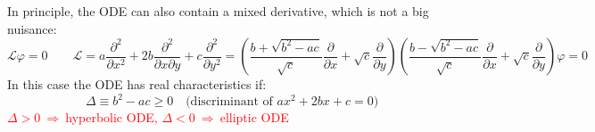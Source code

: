 \documentclass{article}
\begin{document}
\noindent
In principle, the ODE can also contain a mixed derivative, which is not a big nuisance:
\begin{equation}
    \mathcal{L} \varphi = 0
\qquad
\mathcal{L} = a \frac{\partial^2}{\partial x^2}
+ 2b \frac{\partial^2}{\partial x \partial y}
+ c \frac{\partial^2}{\partial y^2}
=
\left( \frac{b + \sqrt{b^2 - a c}}{\sqrt{c}} \frac{\partial}{\partial x}
+ \sqrt{c} \frac{\partial}{\partial y} \right)
\left( \frac{b - \sqrt{b^2 - a c}}{\sqrt{c}} \frac{\partial}{\partial x}
+ \sqrt{c} \frac{\partial}{\partial y} \right) \varphi = 0
\end{equation}
In this case the ODE has real characteristics if:
\begin{equation}
    \Delta \equiv b^2 - ac \geq 0 \quad \text{(discriminant of $ax^2 + 2bx + c =0$)}
\end{equation}
\textcolor{red}{$\Delta >0 \ \Rightarrow \ $hyperbolic ODE, $\Delta < 0 \ \Rightarrow \ $elliptic ODE}

\newpage
\end{document}
